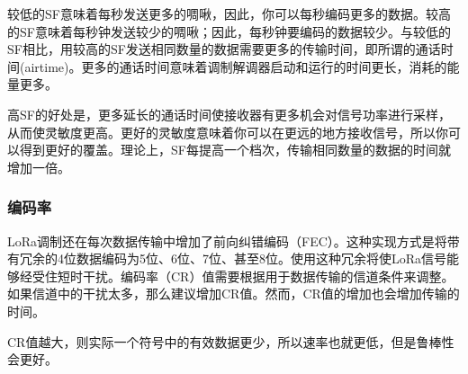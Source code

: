 \documentclass[scheme=chinese,a4paper]{article}
\begin{document}
较低的SF意味着每秒发送更多的啁啾，因此，你可以每秒编码更多的数据。较高的SF意味着每秒钟发送较少的啁啾；因此，每秒钟要编码的数据较少。与较低的SF相比，用较高的SF发送相同数量的数据需要更多的传输时间，即所谓的通话时间(airtime)。更多的通话时间意味着调制解调器启动和运行的时间更长，消耗的能量更多。

高SF的好处是，更多延长的通话时间使接收器有更多机会对信号功率进行采样，从而使灵敏度更高。更好的灵敏度意味着你可以在更远的地方接收信号，所以你可以得到更好的覆盖。理论上，SF每提高一个档次，传输相同数量的数据的时间就增加一倍。
\subsubsection{编码率}
LoRa调制还在每次数据传输中增加了前向纠错编码（FEC）。这种实现方式是将带有冗余的4位数据编码为5位、6位、7位、甚至8位。使用这种冗余将使LoRa信号能够经受住短时干扰。编码率（CR）值需要根据用于数据传输的信道条件来调整。如果信道中的干扰太多，那么建议增加CR值。然而，CR值的增加也会增加传输的时间。

CR值越大，则实际一个符号中的有效数据更少，所以速率也就更低，但是鲁棒性会更好。
\end{document}
